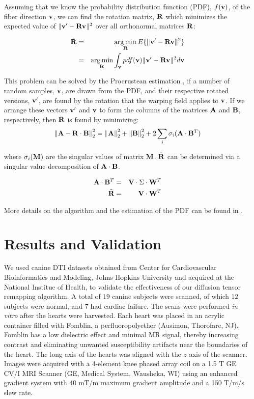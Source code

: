 Assuming that we know the probability distribution function (PDF), $f({\bf v})$, of the fiber direction ${\bf v}$, we can find the rotation matrix, $\tilde{\bf R}$ which minimizes the expected value of $\|{\bf v' -Rv} \|^2$ over all orthonormal matrices ${\bf R}$:

\begin{eqnarray*}
\tilde{\bf R} &=& \mathop{\arg \min}_{\bf R} E\{\|{\bf v' -Rv} \|^2\}\\
&=& \mathop{\arg \min}_{\bf R} \int_{\bf v} pdf({\bf v}) \|{\bf v' -Rv} \|^2 d{\bf v}
\end{eqnarray*}

This problem can be solved by the Procrustean estimation \cite{golub83}, if a number of random samples, ${\bf v}$, are drawn from the PDF, and their respective rotated versions, ${\bf v'}$, are found by the rotation that the warping field applies to ${\bf v}$. If we arrange these vectors ${\bf v'}$ and ${\bf v}$ to form the columns of the matrices ${\bf A}$ and ${\bf B}$, respectively, then $\tilde{\bf R}$ is found by minimizing:
\[
	\left\|{\bf A} - {\bf R}\cdot{\bf B}\right\|_2^2 = \left\|{\bf A}\right\|_2^2 + \left\|{\bf B}\right\|_2^2 + 2\sum_i\sigma_i({\bf A}\cdot{\bf B}^T)
\]

where $\sigma_i(\mathbf{M})$ are the singular values of matrix ${\bf M}$. $\tilde{\bf R}$ can be determined via a singular value decomposition of ${\bf A \cdot B}$.

\begin{eqnarray*}
{\bf A}\cdot{\bf B}^T &=& {\bf V}\cdot\Sigma\cdot {\bf W}^T \\
\tilde{\bf R} &=& {\bf V}\cdot{\bf W}^T 
\end{eqnarray*}

More details on the algorithm and the estimation of the PDF can be found in \cite{xu03}.

\section{Results and Validation}

We used canine DTI datasets obtained from Center for Cardiovascular Bioinformatics and Modeling, Johns Hopkins University and acquired at the National Institue of Health, to validate the effectiveness of our diffusion tensor remapping algorithm. A total of $19$ canine subjects were scanned, of which $12$ subjects were normal, and $7$ had cardiac failure. The scans were performed {\em in vitro} after the hearts were harvested. Each heart was placed in an acrylic container filled with Fomblin, a perfluoropolyether (Ausimon, Thorofare, NJ). Fomblin has a low dielectric effect and minimal MR signal, thereby increasing contrast and eliminating unwanted susceptibility artifacts near the boundaries of the heart.  The long axis of the hearts was aligned with the $z$ axis of the scanner.  Images were acquired with a 4-element knee phased array coil on a 1.5 T GE CV/I MRI Scanner (GE, Medical System, Wausheka, WI) using an enhanced gradient system with 40 mT/m maximum gradient amplitude and a 150 T/m/s slew rate.

